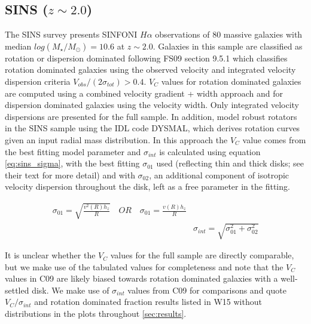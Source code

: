 \documentclass[fleqn,usenatbib]{mn2e}
\begin{document}
\subsection{SINS ($z\sim2.0$)}\label{subsec:SINS}
The SINS survey \citep[FS09]{ForsterSchreiber2009} presents SINFONI $H\alpha$ observations of 80 massive galaxies with median $log(M_{\star}/M_{\odot})=10.6$ at $z\sim2.0$.
Galaxies in this sample are classified as rotation or dispersion dominated following FS09 section 9.5.1 which classifies rotation dominated galaxies using the observed velocity and integrated velocity dispersion criteria $V_{obs}/(2\sigma_{tot}) > 0.4$.
$V_{C}$ values for rotation dominated galaxies are computed using a combined velocity gradient + width approach \citep{ForsterSchreiber2006} and for dispersion dominated galaxies using the velocity width.
Only integrated velocity dispersions are presented for the full sample.
In addition, \cite[C09]{Cresci2009} model robust rotators in the SINS sample using the IDL code DYSMAL, which derives rotation curves given an input radial mass distribution.
In this approach the $V_{C}$ value comes from the best fitting model parameter and $\sigma_{int}$ is calculated using equation \ref{eq:sins_sigma}, with the best fitting $\sigma_{01}$ used (reflecting thin and thick disks; see their text for more detail) and with $\sigma_{02}$, an additional component of isotropic velocity dispersion throughout the disk, left as a free parameter in the fitting.

\begin{equation}\label{eq:sins_sigma}
\begin{split}
\sigma_{01} = \sqrt{\frac{v^{2}(R)h_{z}}{R}} \quad OR \quad \sigma_{01} = \frac{v(R)h_{z}}{R} \\
& \sigma_{int} = \sqrt{\sigma_{01}^{2} + \sigma_{02}^{2}}
\end{split}
\end{equation}

It is unclear whether the $V_{C}$ values for the full sample are directly comparable, but we make use of the tabulated values for completeness and note that the $V_{C}$ values in C09 are likely biased towards rotation dominated galaxies with a well-settled disk.
We make use of $\sigma_{int}$ values from C09 for comparisons and quote $V_{C}/\sigma_{int}$ and rotation dominated fraction results listed in W15 without distributions in the plots throughout \cref{sec:results}.
\end{document}
